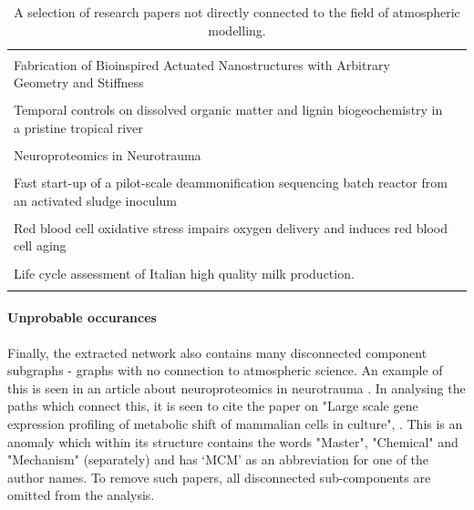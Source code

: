 \begin{table}[H]
\begin{center}
\begin{tabular}{ p{}|l }
 \hline
   & \\
 Fabrication of Bioinspired Actuated Nanostructures with Arbitrary Geometry and Stiffness & \citep{nano} \\ \\
 Temporal controls on dissolved organic matter and lignin biogeochemistry in a pristine tropical river  & \citep{biogeo} \\ \\
Neuroproteomics in Neurotrauma & \citep{neurotrauma}\\ \\
%
Fast start-up of a pilot-scale deammonification sequencing batch reactor from an activated sludge inoculum & \citep{pilot} \\ \\
Red blood cell oxidative stress impairs oxygen  delivery and induces red blood cell aging & \citep{blood} \\ \\
%
Life cycle assessment of Italian high quality milk production. & \citep{milk}\\ \\
%
 \hline
\end{tabular}
\end{center}

\caption{A selection of research papers not directly connected to the field of atmospheric modelling.}
\label{table:otherpapers}
\end{table}



\paragraph*{Unprobable occurances}
Finally, the extracted network also contains many disconnected component subgraphs - graphs with no connection to atmospheric science. An example of this is seen in an article about neuroproteomics in neurotrauma \citep{neurotrauma}. In analysing the paths which connect this, it is seen to cite the paper on "Large scale gene expression profiling of metabolic shift of mammalian cells in culture", \citep{neuro2}. This is an anomaly which within its structure contains the words "Master", "Chemical" and "Mechanism" (separately) and has `MCM' as an abbreviation for one of the author names. To remove such papers, all disconnected sub-components are omitted from the analysis. 





